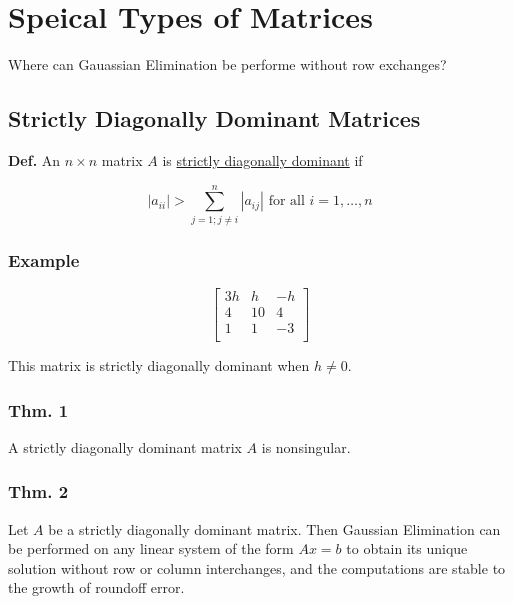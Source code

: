 \renewcommand{\arraystretch}{1.25} %
\setlength{\arraycolsep}{12pt}

\section{Speical Types of Matrices}

\noindent
Where can Gauassian Elimination be performe without row exchanges?

\subsection{Strictly Diagonally Dominant Matrices}

\textbf{Def.} An $n\times n$ matrix $A$ is \uline{strictly diagonally dominant} 
if 

\begin{equation*}
  |a_{ii}| > \sum_{j=1; j\ne i}^{n} |a_{ij}| \text{ for all } i=1,\dots,n
\end{equation*}

\subsubsection*{Example}

\begin{equation*}
  \begin{bmatrix}
  3h & h & -h\\
  4 & 10 & 4\\
  1 & 1 & -3\\
  \end{bmatrix}
\end{equation*}

This matrix is strictly diagonally dominant when $h\ne 0$.

\subsubsection{Thm. 1}

A strictly diagonally dominant matrix $A$ is nonsingular.

\subsubsection{Thm. 2}

Let $A$ be a strictly diagonally dominant matrix. Then Gaussian Elimination
can be performed on any linear system of the form $Ax=b$ to obtain its 
unique solution without row or column interchanges, and the computations
are stable to the growth of roundoff error.

